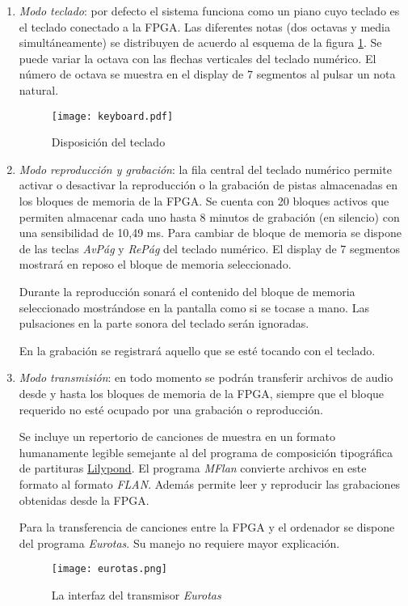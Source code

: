 \documentclass{article}
\begin{document}
	\begin{enumerate}
		\item {\itshape Modo teclado}: por defecto el sistema funciona como un piano cuyo teclado es el teclado conectado a la FPGA. Las diferentes notas (dos octavas y media simultáneamente) se distribuyen de acuerdo al esquema de la figura \ref{fig:teclado}. Se puede variar la octava con las flechas verticales del teclado numérico. El número de octava se muestra en el display de 7 segmentos al pulsar un nota natural.

\begin{figure}[ht] \centering
	\texttt{[image: keyboard.pdf]}

	\caption{Disposición del teclado}
	\label{fig:teclado}
\end{figure}

	\item {\itshape Modo reproducción y grabación}: la fila central del teclado numérico permite activar o desactivar la reproducción o la grabación de pistas almacenadas en los bloques de memoria de la FPGA. Se cuenta con 20 bloques activos que permiten almacenar cada uno hasta 8 minutos de grabación (en silencio) con una sensibilidad de 10,49 ms. Para cambiar de bloque de memoria se dispone de las teclas {\itshape AvPág} y {\itshape RePág} del teclado numérico. El display de 7 segmentos mostrará en reposo el bloque de memoria seleccionado.

		Durante la reproducción sonará el contenido del bloque de memoria seleccionado mostrándose en la pantalla como si se tocase a mano. Las pulsaciones en la parte sonora del teclado serán ignoradas.

		En la grabación se registrará aquello que se esté tocando con el teclado.

	\item {\itshape Modo transmisión}: en todo momento se podrán transferir archivos de audio desde y hasta los bloques de memoria de la FPGA, siempre que el bloque requerido no esté ocupado por una grabación o reproducción.

		Se incluye un repertorio de canciones de muestra en un formato humanamente legible semejante al del programa de composición tipográfica de partituras \href{http://lilypond.org/}{Lilypond}. El programa {\itshape MFlan} convierte archivos en este formato al formato {\itshape FLAN}. Además permite leer y reproducir las grabaciones obtenidas desde la FPGA.

		Para la transferencia de canciones entre la FPGA y el ordenador se dispone del programa {\itshape Eurotas}. Su manejo no requiere mayor explicación.

\begin{figure}[ht] \centering
	\texttt{[image: eurotas.png]}

	\caption{La interfaz del transmisor {\itshape Eurotas}}
	\label{fig:eurotas}
\end{figure}
	\end{enumerate}
\end{document}
